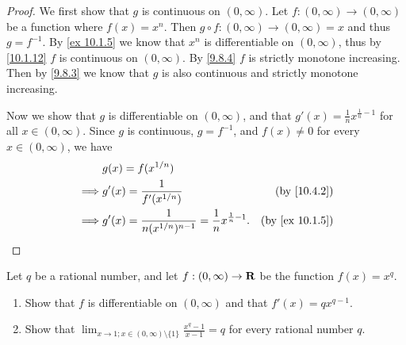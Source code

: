\begin{proof}
  We first show that \(g\) is continuous on \((0, \infty)\).
  Let \(f : (0, \infty) \to (0, \infty)\) be a function where \(f(x) = x^n\).
  Then \(g \circ f : (0, \infty) \to (0, \infty) = x\) and thus \(g = f^{-1}\).
  By \cref{ex 10.1.5} we know that \(x^n\) is differentiable on \((0, \infty)\), thus by \cref{10.1.12} \(f\) is continuous on \((0, \infty)\).
  By \cref{9.8.4} \(f\) is strictly monotone increasing.
  Then by \cref{9.8.3} we know that \(g\) is also continuous and strictly monotone increasing.

  Now we show that \(g\) is differentiable on \((0, \infty)\), and that \(g'(x) = \frac{1}{n} x^{\frac{1}{n} - 1}\) for all \(x \in (0, \infty)\).
  Since \(g\) is continuous, \(g = f^{-1}\), and \(f(x) \neq 0\) for every \(x \in (0, \infty)\), we have
  \begin{align*}
             & g(x) = f(x^{1 / n})                                                                                       \\
    \implies & g'(x) = \frac{1}{f'(x^{1 / n})}                                            & \text{(by \cref{10.4.2})}    \\
    \implies & g'(x) = \frac{1}{n (x^{1 / n})^{n - 1}} = \frac{1}{n} x^{\frac{1}{n} - 1}. & \text{(by \cref{ex 10.1.5})}
  \end{align*}
\end{proof}

\begin{exercise}\label{ex 10.4.2}
  Let \(q\) be a rational number, and let \(f : (0, \infty) \to \mathbf{R}\) be the function \(f(x) = x^q\).
  \begin{enumerate}
    \item Show that \(f\) is differentiable on \((0, \infty)\) and that \(f'(x) = q x^{q - 1}\).
    \item Show that \(\lim_{x \to 1 ; x \in (0, \infty) \setminus \{1\}} \frac{x^q - 1}{x - 1} = q\) for every rational number \(q\).
  \end{enumerate}
\end{exercise}

